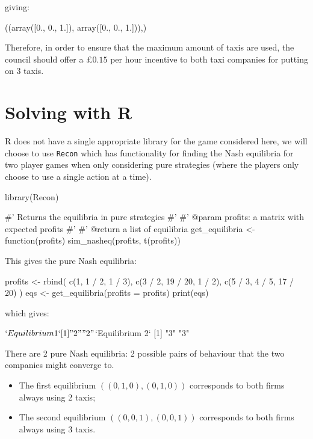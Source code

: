 giving:

\begin{pyout}
((array([0., 0., 1.]), array([0., 0., 1.])),)
\end{pyout}

Therefore, in order to ensure that the maximum amount of taxis are used, the
council should offer a \(\pounds 0.15\) per hour incentive to both taxi
companies for putting on 3 taxis.

\section{Solving with R}\label{sec:solving-with-R}

R does not have a single appropriate library for the game considered here, we
will choose to use \texttt{Recon} which has functionality for finding the
Nash equilibria for two player games when only considering pure strategies
(where the players only choose to use a single action at a time).

\begin{Rin}
library(Recon)

#' Returns the equilibria in pure strategies
#'
#' @param profits: a matrix with expected profits
#'
#' @return a list of equilibria
get_equilibria <- function(profits){
    sim_nasheq(profits, t(profits))
}
\end{Rin}

This gives the pure Nash equilibria:

\begin{Rin}

profits <- rbind(
        c(1, 1 / 2, 1 / 3),
        c(3 / 2, 19 / 20, 1 / 2),
        c(5 / 3, 4 / 5, 17 / 20)
    )
eqs <- get_equilibria(profits = profits)
print(eqs)
\end{Rin}

which gives:

\begin{Rout}
$`Equilibrium 1`
[1] "2" "2"

$`Equilibrium 2`
[1] "3" "3"

\end{Rout}

There are 2 pure Nash equilibria: 2 possible pairs of behaviour that the two
companies might converge to.

\begin{itemize}
    \item The first equilibrium \(((0, 1, 0), (0, 1, 0))\) corresponds to both
          firms always using 2 taxis;
    \item The second equilibrium \(((0, 0, 1), (0, 0, 1))\) corresponds to both
          firms always using 3 taxis.
\end{itemize}

